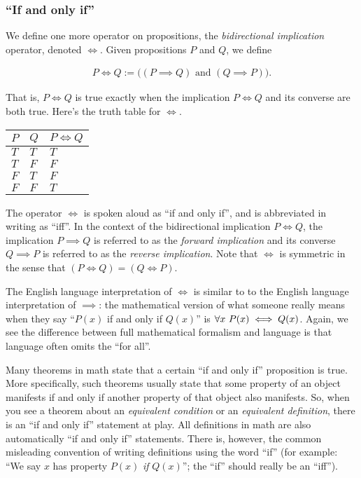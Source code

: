 \subsubsection*{``If and only if''}

We define one more operator on propositions, the \textit{bidirectional implication} operator, denoted $\iff$. Given propositions $P$ and $Q$, we define

\begin{align*}
    P \iff Q := \Big( (P \implies Q) \text{ and } (Q \implies P) \Big).
\end{align*}

That is, $P \iff Q$ is true exactly when the implication $P \iff Q$ and its converse are both true. Here's the truth table for $\iff$.

\begin{table}[H]
    \centering
    \begin{tabular}{|l|l|l|}
    \hline
    $P$ & $Q$ & $P \iff Q$ \\ \hline
    $T$ & $T$ & $T$        \\ \hline
    $T$ & $F$ & $F$        \\ \hline
    $F$ & $T$ & $F$        \\ \hline
    $F$ & $F$ & $T$        \\ \hline
    \end{tabular}
\end{table}

The operator $\iff$ is spoken aloud as ``if and only if'', and is abbreviated in writing as ``iff''. In the context of the bidirectional implication $P \iff Q$, the implication $P \implies Q$ is referred to as the \textit{forward implication} and its converse $Q \implies P$ is referred to as the \textit{reverse implication}. Note that $\iff$ is symmetric in the sense that $(P \iff Q) = (Q \iff P)$.

The English language interpretation of $\iff$ is similar to to the English language interpretation of $\implies$: the mathematical version of what someone really means when they say ``$P(x)$ if and only if $Q(x)$'' is $\forall x \text{ } P(x) \iff Q(x)$. Again, we see the difference between full mathematical formalism and language is that language often omits the ``for all''.

Many theorems in math state that a certain ``if and only if'' proposition is true. More specifically, such theorems usually state that some property of an object manifests if and only if another property of that object also manifests. So, when you see a theorem about an \textit{equivalent condition} or an \textit{equivalent definition}, there is an ``if and only if'' statement at play. All definitions in math are also automatically ``if and only if'' statements. There is, however, the common misleading convention of writing definitions using the word ``if'' (for example: ``We say $x$ has property $P(x)$ \textit{if} $Q(x)$''; the ``if'' should really be an ``iff'').

